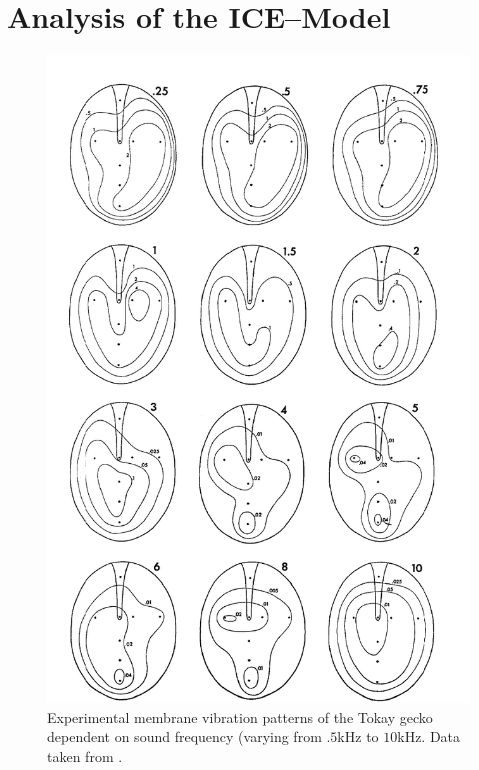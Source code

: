\chapter{Analysis of the ICE--Model}

\begin{figure}[ht!]
 \centering
 \includegraphics[width=.5\linewidth]{Diagrams/manleygeckoear2.png}
 \caption[Tokay gecko tympanum vibration profiles.]{Experimental membrane vibration patterns of the Tokay gecko dependent
 on sound frequency (varying from $.5$kHz to $10$kHz. Data taken from \cite{manleygecko1}.}
  \label{manleygeckotympanum}
\end{figure}